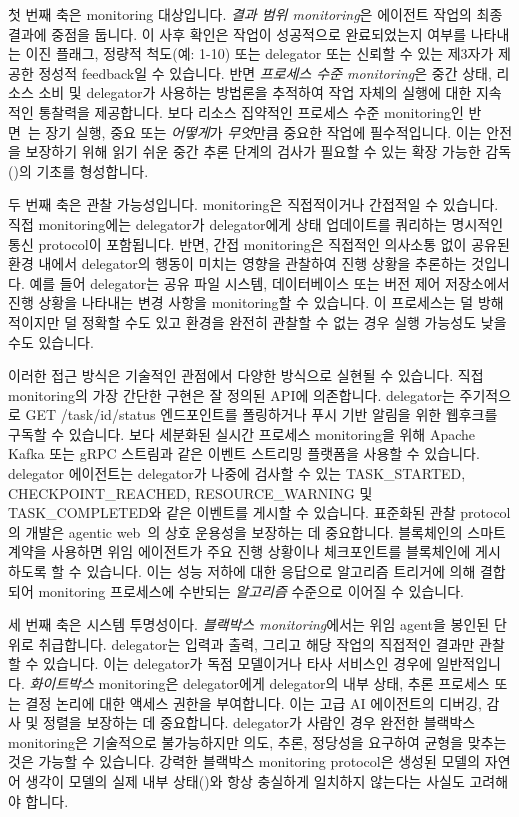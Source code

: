 \documentclass[11pt, a4paper, twocolumn, copyright, goog]{google}
\begin{document}
첫 번째 축은 monitoring 대상입니다. \emph{결과 범위 monitoring}은 에이전트 작업의 최종 결과에 중점을 둡니다. 이 사후 확인은 작업이 성공적으로 완료되었는지 여부를 나타내는 이진 플래그, 정량적 척도(예: 1-10) 또는 delegator 또는 신뢰할 수 있는 제3자가 제공한 정성적 feedback일 수 있습니다. 반면 \emph{프로세스 수준 monitoring}은 중간 상태, 리소스 소비 및 delegator가 사용하는 방법론을 추적하여 작업 자체의 실행에 대한 지속적인 통찰력을 제공합니다. 보다 리소스 집약적인 프로세스 수준 monitoring인 반면~\citep{lightman2023letsverifystepstep}는 장기 실행, 중요 또는 \emph{어떻게}가 \emph{무엇}만큼 중요한 작업에 필수적입니다. 이는 안전을 보장하기 위해 읽기 쉬운 중간 추론 단계의 검사가 필요할 수 있는 확장 가능한 감독(\citep{bowman2022measuringprogressscalableoversight, saunders2022selfcritiquingmodelsassistinghuman})의 기초를 형성합니다.

두 번째 축은 관찰 가능성입니다. monitoring은 직접적이거나 간접적일 수 있습니다. 직접 monitoring에는 delegator가 delegator에게 상태 업데이트를 쿼리하는 명시적인 통신 protocol이 포함됩니다. 반면, 간접 monitoring은 직접적인 의사소통 없이 공유된 환경 내에서 delegator의 행동이 미치는 영향을 관찰하여 진행 상황을 추론하는 것입니다. 예를 들어 delegator는 공유 파일 시스템, 데이터베이스 또는 버전 제어 저장소에서 진행 상황을 나타내는 변경 사항을 monitoring할 수 있습니다. 이 프로세스는 덜 방해적이지만 덜 정확할 수도 있고 환경을 완전히 관찰할 수 없는 경우 실행 가능성도 낮을 수도 있습니다.

이러한 접근 방식은 기술적인 관점에서 다양한 방식으로 실현될 수 있습니다. 직접 monitoring의 가장 간단한 구현은 잘 정의된 API에 의존합니다. delegator는 주기적으로 GET /task/{id}/status 엔드포인트를 폴링하거나 푸시 기반 알림을 위한 웹후크를 구독할 수 있습니다. 보다 세분화된 실시간 프로세스 monitoring을 위해 Apache Kafka 또는 gRPC 스트림과 같은 이벤트 스트리밍 플랫폼을 사용할 수 있습니다. delegator 에이전트는 delegator가 나중에 검사할 수 있는 TASK\_STARTED, CHECKPOINT\_REACHED, RESOURCE\_WARNING 및 TASK\_COMPLETED와 같은 이벤트를 게시할 수 있습니다. 표준화된 관찰 protocol의 개발은 agentic web~\citep{blanco2023practical}의 상호 운용성을 보장하는 데 중요합니다. 블록체인의 스마트 계약을 사용하면 위임 에이전트가 주요 진행 상황이나 체크포인트를 블록체인에 게시하도록 할 수 있습니다. 이는 성능 저하에 대한 응답으로 알고리즘 트리거에 의해 결합되어 monitoring 프로세스에 수반되는 \emph{알고리즘} 수준으로 이어질 수 있습니다.

세 번째 축은 시스템 투명성이다. \emph{블랙박스 monitoring}에서는 위임 agent을 봉인된 단위로 취급합니다. delegator는 입력과 출력, 그리고 해당 작업의 직접적인 결과만 관찰할 수 있습니다. 이는 delegator가 독점 모델이거나 타사 서비스인 경우에 일반적입니다. \emph{화이트박스} monitoring은 delegator에게 delegator의 내부 상태, 추론 프로세스 또는 결정 논리에 대한 액세스 권한을 부여합니다. 이는 고급 AI 에이전트의 디버깅, 감사 및 정렬을 보장하는 데 중요합니다. delegator가 사람인 경우 완전한 블랙박스 monitoring은 기술적으로 불가능하지만 의도, 추론, 정당성을 요구하여 균형을 맞추는 것은 가능할 수 있습니다. 강력한 블랙박스 monitoring protocol은 생성된 모델의 자연어 생각이 모델의 실제 내부 상태(\citep{turpin2023languagemodelsdontsay})와 항상 충실하게 일치하지 않는다는 사실도 고려해야 합니다.
\end{document}
